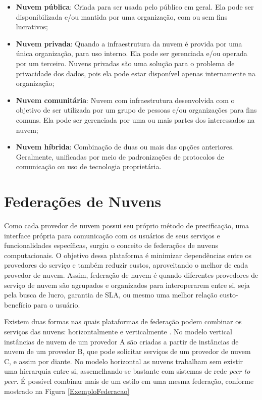 \begin{itemize}
	\item \textbf{Nuvem pública}: Criada para ser usada pelo público em geral. Ela pode ser disponibilizada e/ou mantida por uma organização, com ou sem fins lucrativos;
	\item \textbf{Nuvem privada}: Quando a infraestrutura da nuvem é provida por uma única organização, para uso interno. Ela pode ser gerenciada e/ou operada por um terceiro. Nuvens privadas são uma solução para o problema de privacidade dos dados, pois ela pode estar disponível apenas internamente na organização;
	\item \textbf{Nuvem comunitária}: Nuvem com infraestrutura desenvolvida com o objetivo de ser utilizada por um grupo de pessoas e/ou organizações para fins comuns. Ela pode ser gerenciada por uma ou mais partes dos interessados na nuvem;
	\item \textbf{Nuvem híbrida}: Combinação de duas ou mais das opções anteriores. Geralmente, unificadas por meio de padronizações de protocolos de comunicação ou uso de tecnologia proprietária.
\end{itemize}

\section{Federações de Nuvens}

Como cada provedor de nuvem possui seu próprio método de precificação, uma interface própria para comunicação com os usuários de seus serviços e funcionalidades específicas, surgiu o conceito de federações de nuvens computacionais. O objetivo dessa plataforma é minimizar dependências entre os provedores do serviço e também reduzir custos, aproveitando o melhor de cada provedor de nuvem. Assim, federação de nuvem é quando diferentes provedores de serviço de nuvem são agrupados e organizados para interoperarem entre si, seja pela busca de lucro, garantia de \acrshort{SLA}, ou mesmo uma melhor relação custo-benefício para o usuário.

Existem duas formas nas quais plataformas de federação podem combinar os serviços das nuvens: horizontalmente e verticalmente \cite{5557976}\cite{7835207}. No modelo vertical instâncias de nuvem de um provedor A são criadas a partir de instâncias de nuvem de um provedor B, que pode solicitar serviços de um provedor de nuvem C, e assim por diante. No modelo horizontal as nuvens trabalham sem existir uma hierarquia entre si, assemelhando-se bastante com sistemas de rede \textit{peer to peer}. É possível combinar mais de um estilo em uma mesma federação, conforme mostrado na Figura \ref{ExemploFederacao}

